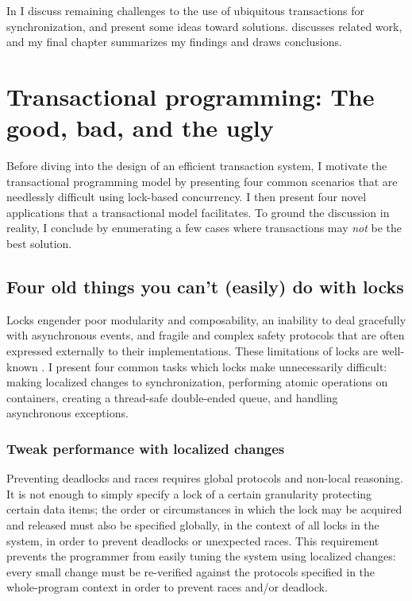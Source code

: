 In  I discuss remaining challenges to the use of
ubiquitous transactions for synchronization, and present some ideas
toward solutions.  discusses related work, and my
final chapter summarizes my findings and draws conclusions.


\chapter{Transactional programming: The good, bad, and the ugly}
\label{cha:examples}

Before diving into the design of an efficient transaction system,
I motivate the transactional programming model by
presenting four common scenarios that are needlessly
difficult using lock-based concurrency.  I then present four novel
applications that a transactional model facilitates.  To ground the
discussion in reality, I conclude by enumerating a few cases where
transactions may \emph{not} be the best solution.

\section{Four old things you can't (easily) do with locks}
Locks engender poor modularity and composability, an inability to deal
gracefully with asynchronous events, and fragile and complex safety
protocols that are often expressed externally to their
implementations.  These limitations of locks are well-known
\cite{Herlihy05}.  I present four common tasks which locks make
unnecessarily difficult: making localized changes to synchronization,
performing atomic operations on containers, creating a thread-safe
double-ended queue, and handling asynchronous exceptions.

\subsection{Tweak performance with localized changes}
Preventing deadlocks and races requires global protocols and non-local
reasoning.  It is not enough to simply specify a lock of a certain
granularity protecting certain data items; the order or circumstances
in which the lock may be acquired and released must also be specified
globally, in the context of all locks in the system, in order to
prevent deadlocks or unexpected races.  This requirement prevents the
programmer from easily tuning the system using localized changes:
every small change must be re-verified against the protocols specified
in the whole-program context in order to prevent races and/or
deadlock.

